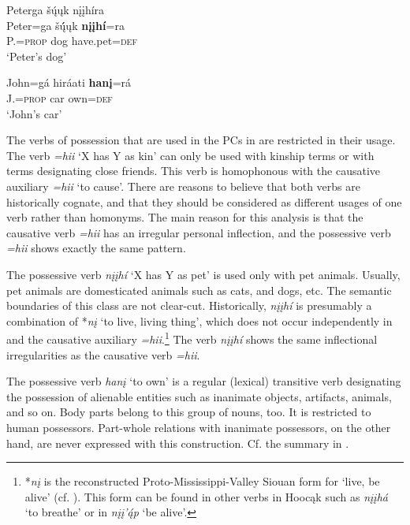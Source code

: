 \documentclass[output=paper]{LSP/langsci}
\begin{document}
\ex 
\glll Peterga šų́ųk nįįhíra \\
Peter=ga      šų́́ųk   \textbf{nįįhí}=ra \\
P.=\textsc{prop} dog   have.pet=\textsc{def} \\
\glt `Peter's dog'

\ex \gll John=gá      hiráati \textbf{hanį}=rá \\
J.=\textsc{prop} car       own=\textsc{def} \\
\glt `John's car'

\z \z

The verbs of possession that are used in the PCs in  are restricted in their usage. The verb \textit{=hii} `X has Y as kin' can only be used with kinship terms or with terms designating close friends. This verb is homophonous with the causative auxiliary \textit{=hii} `to cause'. There are reasons to believe that both verbs are historically cognate, and that they should be considered as different usages of one verb rather than homonyms. The main reason for this analysis is that the causative verb \textit{=hii} has an irregular personal inflection, and the possessive verb \textit{=hii} shows exactly the same pattern. 

The possessive verb \textit{nįįh\'i} `X has Y as pet' is used only with pet animals. Usually, pet animals are domesticated animals such as cats, and dogs, etc. The semantic boundaries of this class are not clear-cut. Historically, \textit{nįįhí} is presumably a combination of *\textit{nį} `to live, living thing', which does not occur independently in  and the causative auxiliary \textit{=hii}.\footnote{*\textit{n\k{i}} is the reconstructed Proto-Mississippi-Valley Siouan form for `live, be alive' (cf. \citealt{RankinEtAl2015AccessMay}). This form can be found in other verbs in Hooc\k{a}k such as \textit{n\k{i}\k{i}h\'a} `to breathe'  or in \textit{n\k{i}\k{i}'\'{\k{a}}p} `be alive'.} The verb \textit{nįįhí} shows the same inflectional irregularities as the causative verb \textit{=hii}. 

The possessive verb \textit{han\k{i}} `to own' is a regular (lexical) transitive verb designating the possession of alienable entities such as inanimate objects, artifacts, animals, and so on. Body parts belong to this group of nouns, too. It is restricted to human possessors. Part-whole relations with inanimate possessors, on the other hand, are never expressed with this construction. Cf. the summary in .
\end{document}
